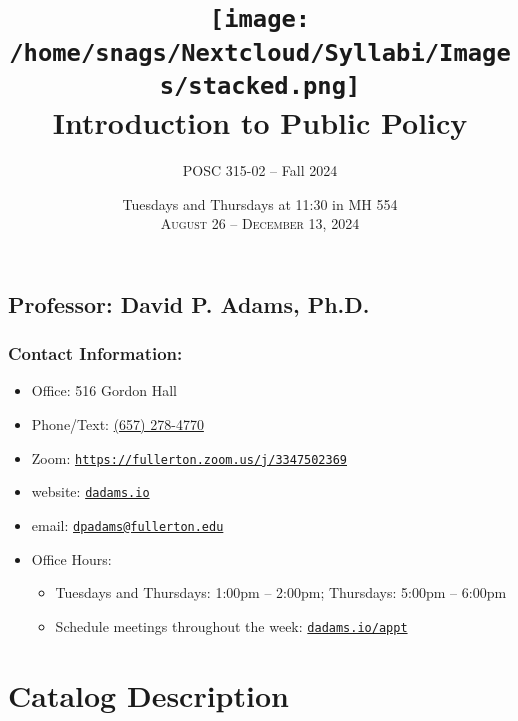 \documentclass[12pt, letterpaper]{article}
\begin{document}
\title{\texttt{[image: /home/snags/Nextcloud/Syllabi/Images/stacked.png]} \\\vspace{1ex} \textbf{Introduction to Public Policy}}

\author{POSC 315-02 -- Fall 2024}
\date{Tuesdays and Thursdays at 11:30 in MH 554 \\\vspace{2ex} \textsc{August 26 -- December 13, 2024}}

    \maketitle


\subsection*{Professor: David P. Adams, Ph.D.}

\subsubsection*{Contact Information:}

\begin{itemize}
	\item Office: 516 Gordon Hall
	\item Phone/Text: \href{tel:+16572784770}{(657) 278-4770}
	\item Zoom: \href{https://fullerton.zoom.us/j/3347502369}{\texttt{https://fullerton.zoom.us/j/3347502369}}
	\item website: \href{https://dadams.io}{\texttt{dadams.io}}
	\item email: \href{dpadams@fullerton.edu}{\texttt{dpadams@fullerton.edu}}
	\item Office Hours:
        \begin{itemize}
            \item Tuesdays and Thursdays: 1:00pm -- 2:00pm; Thursdays: 5:00pm -- 6:00pm
            \item Schedule meetings throughout the week: \href{https://dadams.io/appt}{\texttt{dadams.io/appt}}
        \end{itemize}  
\end{itemize}


\section{Catalog Description}
\end{document}

